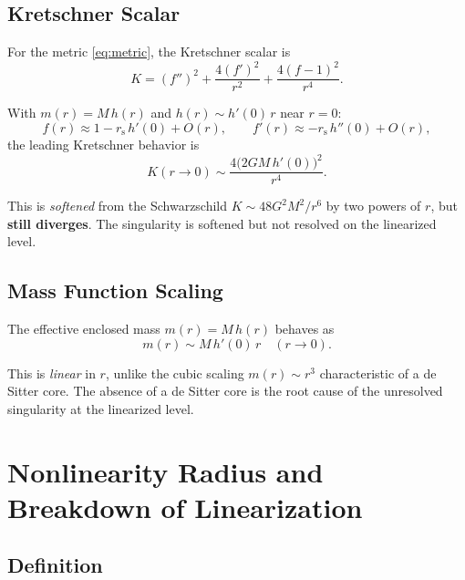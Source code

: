 \documentclass[11pt,a4paper]{article}
\theoremstyle{definition}
\theoremstyle{remark}
\newcommand{\rs}{r_{\mathrm{s}}}
\begin{document}
\subsection{Kretschner Scalar}

For the metric \eqref{eq:metric}, the Kretschner scalar is
\begin{equation}\label{eq:kretschner}
  K = (f'')^2 + \frac{4(f')^2}{r^2} + \frac{4(f-1)^2}{r^4}.
\end{equation}

With $m(r) = M\,h(r)$ and $h(r) \sim h'(0)\,r$ near $r = 0$:
\begin{equation}
  f(r) \approx 1 - \rs\,h'(0) + O(r), \qquad
  f'(r) \approx -\rs\,h''(0) + O(r),
\end{equation}
the leading Kretschner behavior is
\begin{equation}
  K(r \to 0) \sim \frac{4\bigl(2GM\,h'(0)\bigr)^2}{r^4}.
\end{equation}

This is \emph{softened} from the Schwarzschild $K \sim 48G^2M^2/r^6$ by two powers
of $r$, but \textbf{still diverges}. The singularity is softened but not resolved on
the linearized level.

\subsection{Mass Function Scaling}

The effective enclosed mass $m(r) = M\,h(r)$ behaves as
\begin{equation}
  m(r) \sim M\,h'(0)\,r \quad (r \to 0).
\end{equation}

This is \emph{linear} in $r$, unlike the cubic scaling $m(r) \sim r^3$ characteristic
of a de Sitter core. The absence of a de Sitter core is the root cause of the
unresolved singularity at the linearized level.

\section{Nonlinearity Radius and Breakdown of Linearization}

\subsection{Definition}
\end{document}
